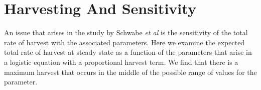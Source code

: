 
\section{Harvesting And Sensitivity}

An issue that arises in the study by Schwabe \textit{et al} is the
sensitivity of the total rate of harvest with the associated
parameters. Here we examine the expected total rate of harvest at
steady state as a function of the parameters that arise in a logistic
equation with a proportional harvest term. We find that there is a
maximum harvest that occurs in the middle of the possible range of
values for the parameter.

